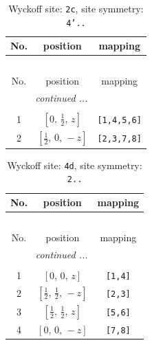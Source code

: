 \documentclass[fleqn,8pt]{jsarticle}
\begin{document}
\renewcommand{\arraystretch}{1.2}
\begin{longtable}{ccc}
\caption{Wyckoff site: {\tt 2c}, site symmetry: {\tt 4'..}}
 \\
 \hline \hline
No. & position & mapping \\ \hline \endfirsthead

\multicolumn{2}{l}{\tablename\ \thetable{}} \\
 \hline \hline
No. & position & mapping \\ \hline \endhead

 \hline \hline
\multicolumn{2}{r}{\footnotesize\it continued ...} \\ \endfoot

 \hline \hline
\multicolumn{2}{r}{} \\ \endlastfoot

1 & $\left[ 0,\, \frac{1}{2},\, z \right]$ & {\tt [1,4,5,6]} \\ \hline
2 & $\left[ \frac{1}{2},\, 0,\, - z \right]$ & {\tt [2,3,7,8]} \\
\end{longtable}
\renewcommand{\arraystretch}{1.2}
\begin{longtable}{ccc}
\caption{Wyckoff site: {\tt 4d}, site symmetry: {\tt 2..}}
 \\
 \hline \hline
No. & position & mapping \\ \hline \endfirsthead

\multicolumn{2}{l}{\tablename\ \thetable{}} \\
 \hline \hline
No. & position & mapping \\ \hline \endhead

 \hline \hline
\multicolumn{2}{r}{\footnotesize\it continued ...} \\ \endfoot

 \hline \hline
\multicolumn{2}{r}{} \\ \endlastfoot

1 & $\left[ 0,\, 0,\, z \right]$ & {\tt [1,4]} \\ \hline
2 & $\left[ \frac{1}{2},\, \frac{1}{2},\, - z \right]$ & {\tt [2,3]} \\ \hline
3 & $\left[ \frac{1}{2},\, \frac{1}{2},\, z \right]$ & {\tt [5,6]} \\ \hline
4 & $\left[ 0,\, 0,\, - z \right]$ & {\tt [7,8]} \\
\end{longtable}
\renewcommand{\arraystretch}{1.2}
\end{document}
